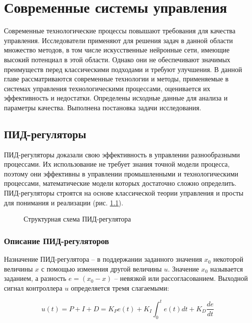 \chapter{Современные системы управления}

Современные технологические процессы повышают требования для качества управления. Исследователи применяют для решения задач в данной области множество методов, в том числе искусственные нейронные сети, имеющие высокий потенциал в этой области. Однако они не обеспечивают значимых преимуществ перед классическими подходами и требуют улучшения.
В данной главе рассматриваются современные технологии и методы, применяемые в системах управления технологическими процессами, оценивается их эффективность и недостатки. Определены исходные данные для анализа и параметры качества. Выполнена постановка задачи исследования.

\section{ПИД-регуляторы}

ПИД-регуляторы доказали свою эффективность в управлении разнообразными процессами. Их использование не требует знания точной модели процесса, поэтому они эффективны в управлении промышленными и технологическими процессами, математические модели которых достаточно сложно определить. ПИД-регуляторы строятся на основе классической теории управления и просты для понимания и реализации (рис. \ref{fig:PID_controller_scheme}).

\begin{figure}[H]
    \centering
    
    \caption{Структурная схема ПИД-регулятора}
    \label{fig:PID_controller_scheme}
\end{figure}

\subsection{Описание ПИД-регуляторов}

Назначение ПИД-регулятора – в поддержании заданного значения $x_0$ некоторой величины $x$ с помощью изменения другой величины $u$. Значение $x_0$ называется заданием, а разность $e = (x_0 - x)$ – невязкой или рассогласованием. Выходной сигнал контроллера $u$ определяется тремя слагаемыми:

\begin{equation}
    \label{eq_PID}
    u(t) = P + I + D = K_P e(t) + K_I \int_{0}^{t} e(t) dt + K_D \frac{de}{dt}
\end{equation}

